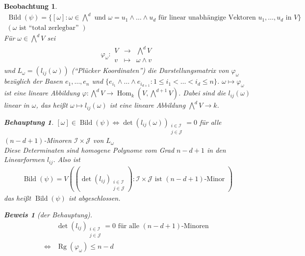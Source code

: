 \documentclass[a4paper,12pt]{report}
\theoremstyle{break}
\theoremstyle{nonumberbreak}
\newtheorem{Beo}{Beobachtung}
\newtheorem{Beh}{Behauptung}
\theoremstyle{nonumberplain}
\newtheorem{Bew}{Beweis}
\newcommand{\Abb}[5]{\ensuremath{#1:\begin{array}{ccc} #2 & \longrightarrow & #3 \\ #4 & \longmapsto & #5 \end{array}}}
\DeclareMathOperator{\Hom}{Hom}
\DeclareMathOperator{\Bild}{Bild}
\DeclareMathOperator{\Rg}{Rg}
\begin{document}
\begin{Beo}
  \begin{align*}
  \Bild(\psi)=\{[\omega]:\omega\in\bigwedge^d\text{ und } \omega=u_1\wedge\dots\wedge u_d
  \text{ für linear unabhängige Vektoren } u_1,\dots, u_d\text{ in } V\} \\
    (\omega \text{ ist ``total zerlegbar'' })
  \end{align*}
  Für $\omega\in \bigwedge^d V$ sei
  \begin{align*}
    \Abb{\varphi_\omega}{V}{\bigwedge^dV}{v}{\omega\wedge v}
  \end{align*}
  und $L_\omega=(l_{ij}(\omega))$ (``Plücker Koordinaten'') die Darstellungsmatrix von
  $\varphi_\omega$ bezüglich der Basen $e_1,\dots,e_n$ und $\{e_{i_1}\wedge\dots\wedge e_{i_{d+1}}:1\leq i_1<\dots <i_d\leq n\}$.
  $\omega\mapsto\varphi_\omega$ ist eine lineare Abbildung $\varphi:\bigwedge^dV\longrightarrow\Hom_k(V,\bigwedge^{d+1}V)$.
  Dabei sind die $l_{ij}(\omega)$ linear in $\omega$, das heißt $\omega\mapsto l_{ij}(\omega)$ ist eine 
  lineare Abbildung $\bigwedge^dV\longrightarrow k$. \\
  \begin{Beh}
    $[\omega]\in\Bild(\psi)\Leftrightarrow\det(l_{ij}(\omega))_{\begin{array}{c} i\in\mathcal I \\ j \in\mathcal J \end{array}}=0$
  für alle $(n-d+1)$-Minoren $\mathcal I\times\mathcal J$ von $L_\omega$ \\
  Diese Determinaten sind homogene Polynome vom Grad $n-d+1$ in den Linearformen $l_{ij}$. Also ist 
  \begin{align*}
    \Bild(\psi)=V((\det(l_{ij})_{\begin{array}{c} i\in\mathcal I \\ j \in\mathcal J \end{array}}):\mathcal I\times\mathcal J
    \text{ ist $(n-d+1)$-Minor })
  \end{align*}
  das heißt $\Bild(\psi)$ ist abgeschlossen.
  \end{Beh}
  \begin{Bew}[der Behauptung]
    \begin{align*}
      & \det(l_{ij})_{\begin{array}{c} i\in\mathcal I \\ j \in\mathcal J \end{array}}=0\text{ für alle $(n-d+1)$-Minoren } \\
      \Leftrightarrow & \Rg(\varphi_\omega)\leq n-d \\

\end{align*}
\end{Bew}
\end{Beo}
\end{document}
